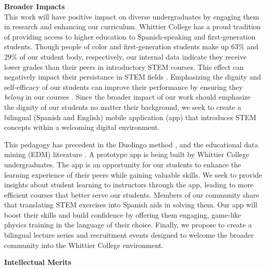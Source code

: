 \documentclass[11pt]{amsart}
\begin{document}
\noindent \textbf{Broader Impacts} \\ \noindent This work will have positive impact on diverse undergraduates by engaging them in research and enhancing our curriculum.  Whittier College has a proud tradition of providing access to higher education to Spanish-speaking and first-generation students.  Though people of color and first-generation students make up 63\% and 29\% of our student body, respectively, our internal data indicate they receive lower grades than their peers in introductory STEM courses.  This effect can negatively impact their persistance in STEM fields \cite{10.1080/00221546.2021.1907169}.  Emphasizing the dignity and self-efficacy of our students can improve their performance by ensuring they \textit{belong} in our courses \cite{cottrell1,cottrell2}.  Since the broader impact of our work should emphasize the dignity of our students no matter their background, we seek to create a bilingual (Spanish and English) mobile application (app) that introduces STEM concepts within a welcoming digital environment.

This pedagogy has precedent in the Duolingo method \cite{duolingo_whitepaper}, and the educational data mining (EDM) literature \cite{edm1,edm2,edm3,edm4}. A prototype app is being built by Whittier College undergraduates.  The app is an opportunity for our students to enhance the learning experience of their peers while gaining valuable skills.  We seek to provide insights about student learning to instructors through the app, leading to more efficient courses that better serve our students.  Members of our community share that translating STEM exercises into Spanish aids in solving them.  Our app will boost their skills and build confidence by offering them engaging, game-like physics training in the language of their choice.  Finally, we propose to create a bilingual lecture series and recruitment events designed to welcome the broader community into the Whittier College environment.

\clearpage

\centerline{\bf \Large Intellectual Merits}
\setcounter{section}{0}
\linespacing

\label{sec:top}
\end{document}
